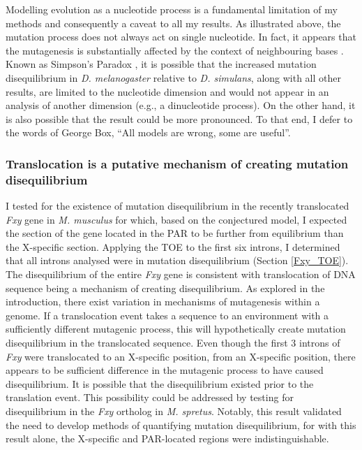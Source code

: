 Modelling evolution as a nucleotide process is a fundamental limitation of my methods and consequently a caveat to all my results. As illustrated above, the mutation process does not always act on single nucleotide. In fact, it appears that the mutagenesis is substantially affected by the context of neighbouring bases \citep{Zhu2020MachineMutations}. Known as Simpson's Paradox \citep{Simpson1951TheTables}, it is possible that the increased mutation disequilibrium in \textit{D. melanogaster} relative to \textit{D. simulans}, along with all other results, are limited to the nucleotide dimension and would not appear in an analysis of another dimension (e.g., a  dinucleotide process). On the other hand, it is also possible that the result could be more pronounced. To that end, I defer to the words of George Box, ``All models are wrong, some are useful''. 

\subsubsection{Translocation is a putative mechanism of creating mutation disequilibrium}

I tested for the existence of mutation disequilibrium in the recently translocated \textit{Fxy} gene in \textit{M. musculus} for which, based on the conjectured model, I expected the section of the gene located in the PAR to be further from equilibrium than the X-specific section. Applying the TOE to the first six introns, I determined that all introns analysed were in mutation disequilibrium (Section \ref{Fxy_TOE}). The disequilibrium of the entire \textit{Fxy} gene is consistent with translocation of DNA sequence being a mechanism of creating disequilibrium. As explored in the introduction, there exist variation in mechanisms of mutagenesis within a genome. If a translocation event takes a sequence to an environment with a sufficiently different mutagenic process, this will hypothetically create mutation disequilibrium in the translocated sequence. Even though the first 3 introns of \textit{Fxy} were translocated to an X-specific position, from an X-specific position, there appears to be sufficient difference in the mutagenic process to have caused disequilibrium. It is possible that the disequilibrium existed prior to the translation event. This possibility could be addressed by testing for disequilibrium in the \textit{Fxy} ortholog in \textit{M. spretus}. Notably, this result validated the need to develop methods of quantifying mutation disequilibrium, for with this result alone, the X-specific and PAR-located regions were indistinguishable.

